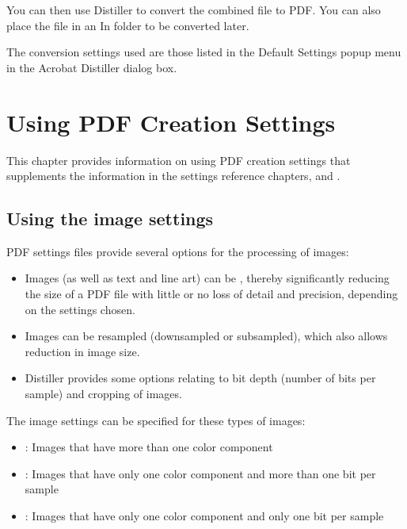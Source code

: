 \documentclass[letterpaper,12pt,english,openany,oneside]{sphinxmanual}
\begin{document}
You can then use Distiller to convert the combined file to PDF. You can also place the file in an In folder to be converted later.

The conversion settings used are those listed in the Default Settings pop\sphinxhyphen{}up menu in the Acrobat Distiller dialog box.


\chapter{Using PDF Creation Settings}
\label{\detokenize{PDF_Create_UsingSettings:using-pdf-creation-settings}}\label{\detokenize{PDF_Create_UsingSettings::doc}}
This chapter provides information on using PDF creation settings that supplements the information in the settings reference chapters,  and .




\section{Using the image settings}
\label{\detokenize{PDF_Create_UsingSettings:using-the-image-settings}}
PDF settings files provide several options for the processing of images:
\begin{itemize}
\item {} 
Images (as well as text and line art) can be  , thereby significantly reducing the size of a PDF file with little or no loss of detail and precision, depending on the settings chosen.

\item {} 
Images can be resampled (downsampled or subsampled), which also allows reduction in image size.

\item {} 
Distiller provides some options relating to bit depth (number of bits per sample) and cropping of images.

\end{itemize}

The image settings can be specified for these types of images:
\begin{itemize}
\item {} 
 : Images that have more than one color component

\item {} 
 : Images that have only one color component and more than one bit per sample

\item {} 
 : Images that have only one color component and only one bit per sample

\end{itemize}
\end{document}
